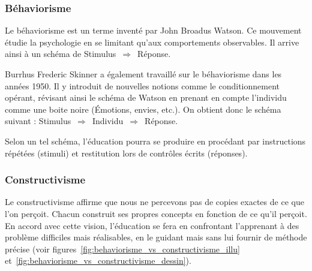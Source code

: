 \subsubsection{Béhaviorisme}
Le béhaviorisme est un terme inventé par John Broadus Watson. Ce mouvement étudie la psychologie en se limitant qu'aux comportements observables. Il arrive ainsi à un schéma de Stimulus~$\Rightarrow$~Réponse.

Burrhus Frederic Skinner a également travaillé sur le béhaviorisme dans les années 1950. Il y introduit de nouvelles notions comme le conditionnement opérant, révisant ainsi le schéma de Watson en prenant en compte l'individu comme une \og boite noire \fg{} (Émotions, envies, etc.). On obtient donc le schéma suivant : Stimulus~$\Rightarrow$~Individu~$\Rightarrow$~Réponse.

Selon un tel schéma, l'éducation pourra se produire en procédant par instructions répétées (stimuli) et restitution lors de contrôles écrits (réponses).

\subsubsection{Constructivisme}
Le constructivisme affirme que nous ne percevons pas de copies exactes de ce que l'on perçoit. Chacun construit ses propres concepts en fonction de ce qu'il perçoit. En accord avec cette vision, l'éducation se fera en confrontant l'apprenant à des problème difficiles mais réalisables, en le guidant mais sans lui fournir de méthode précise (voir figures~\ref{fig:behaviorisme_vs_constructivisme_illu} et~\ref{fig:behaviorisme_vs_constructivisme_dessin}).

